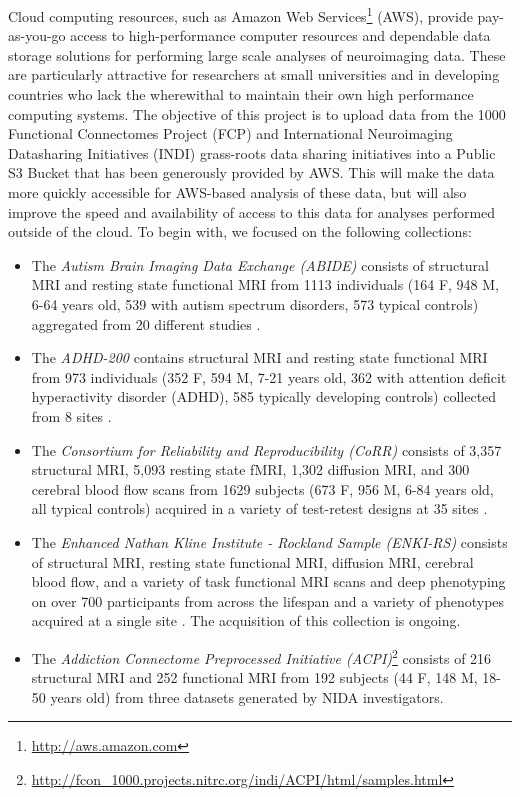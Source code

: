 \documentclass[twocolumn]{bmcart}%
\begin{document}
Cloud computing resources, such as Amazon Web
Services\footnote{\url{http://aws.amazon.com}} (AWS), provide
pay-as-you-go access to high-performance computer resources and
dependable data storage solutions for performing large scale analyses of
neuroimaging data\cite{Clark2015}. These are particularly attractive for
researchers at small universities and in developing countries who lack
the wherewithal to maintain their own high performance computing
systems. The objective of this project is to upload data from the 1000
Functional Connectomes Project (FCP)\cite{biswal2010} and International
Neuroimaging Datasharing Initiatives (INDI) \cite{mennes2013}
grass-roots data sharing initiatives into a Public S3 Bucket that has
been generously provided by AWS. This will make the data more quickly
accessible for AWS-based analysis of these data, but will also improve
the speed and availability of access to this data for analyses performed
outside of the cloud. To begin with, we focused on the following
collections:

\begin{itemize}
\itemsep1pt\parskip0pt
\item
  The \emph{Autism Brain Imaging Data Exchange (ABIDE)} consists of
  structural MRI and resting state functional MRI from 1113 individuals
  (164 F, 948 M, 6-64 years old, 539 with autism spectrum disorders, 573
  typical controls) aggregated from 20 different studies
  \cite{dimartino2014}.
\item
  The \emph{ADHD-200} contains structural MRI and resting state
  functional MRI from 973 individuals (352 F, 594 M, 7-21 years old, 362
  with attention deficit hyperactivity disorder (ADHD), 585 typically
  developing controls) collected from 8 sites \cite{Milham2012}.
\item
  The \emph{Consortium for Reliability and Reproducibility (CoRR)}
  consists of 3,357 structural MRI, 5,093 resting state fMRI, 1,302
  diffusion MRI, and 300 cerebral blood flow scans from 1629 subjects
  (673 F, 956 M, 6-84 years old, all typical controls) acquired in a
  variety of test-retest designs at 35 sites \cite{zuo2014}.
\item
  The \emph{Enhanced Nathan Kline Institute - Rockland Sample (ENKI-RS)}
  consists of structural MRI, resting state functional MRI, diffusion
  MRI, cerebral blood flow, and a variety of task functional MRI scans
  and deep phenotyping on over 700 participants from across the lifespan
  and a variety of phenotypes acquired at a single site
  \cite{nooner2012}. The acquisition of this collection is ongoing.
\item
  The \emph{Addiction Connectome Preprocessed Initiative
  (ACPI)}\footnote{\url{http://fcon_1000.projects.nitrc.org/indi/ACPI/html/samples.html}}
  consists of 216 structural MRI and 252 functional MRI from 192
  subjects (44 F, 148 M, 18-50 years old) from three datasets generated
  by NIDA investigators.
\end{itemize}
\end{document}
